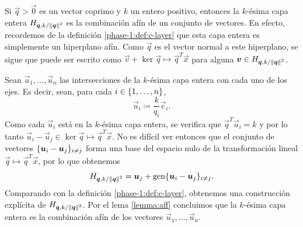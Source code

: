 \begin{example}
	\label{ex:aff}


	Si $\vec{q} > \vec{0}$ es un vector coprimo y $k$ un entero positivo, entonces la $k$-ésima capa
	entera $H_{\boldsymbol{\boldsymbol{q}}, k/\left\lVert \boldsymbol{\boldsymbol{q}} \right\rVert^{2}}$ es la combinación afín de un conjunto de vectores.
	En efecto, recordemos de la definición \ref{phase-1:def:c-layer} que esta capa entera es
	simplemente un hiperplano afín. Como $\vec{q}$ es el vector normal a este hiperplano, se sigue
	que puede ser escrito como $\vec{v} + \ker{\vec{q} \mapsto \vec{q}^T\vec{x}}$ para alguna
	$\boldsymbol{v} \in H_{\boldsymbol{\boldsymbol{q}}, k/\left\lVert \boldsymbol{\boldsymbol{q}} \right\rVert^{2}}$.

	Sean $\vec{u}_1, \ldots, \vec{u}_n$ las intersecciones de la $k$-ésima capa entera con cada uno
	de los ejes. Es decir, sean, para cada $i \in \lbrace 1, \ldots, n \rbrace$,
	\begin{equation}
		\label{def:u-basis}
		\vec{u}_i \coloneq \frac{k}{q_i}\vec{e}_i.
	\end{equation}
	Como cada $\vec{u}_i$ está en la $k$-ésima capa entera, se verifica que $\vec{q}^T\vec{u}_i = k$
	y por lo tanto $\vec{u}_i - \vec{u}_j \in \ker{\vec{q} \mapsto \vec{q}^T\vec{x}}$. No es difícil
	ver entonces que el conjunto de vectores $\lbrace \boldsymbol{u}_i - \boldsymbol{u}_j \rbrace_{i \neq j}$ forma una
	base del espacio nulo de la transformación lineal $\vec{q} \mapsto \vec{q}^T\vec{x}$, por lo que
	obtenemos
	\begin{equation*}
		H_{\boldsymbol{\boldsymbol{q}}, k/\left\lVert \boldsymbol{\boldsymbol{q}} \right\rVert^{2}} = \boldsymbol{u}_j + \operatorname{gen}\lbrace \boldsymbol{u}_i - \boldsymbol{u}_j \rbrace_{i \neq
		j}.
	\end{equation*}
	Comparando con la definición \ref{phase-1:def:c-layer}, obtenemos una
	construcción explícita de $H_{\boldsymbol{\boldsymbol{q}}, k/\left\lVert \boldsymbol{\boldsymbol{q}} \right\rVert^{2}}$. Por el lema
	\ref{lemma:aff} concluimos que la $k$-ésima capa entera es la combinación
	afín de los vectores $\vec{u}_1, \ldots, \vec{u}_n$.
\end{example}

